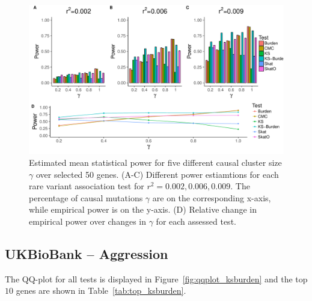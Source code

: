 \begin{figure}[ht!]
  \centering
  \includegraphics[width=0.8\linewidth]{ksburden/figures/combined_power_analysis.pdf}
  \caption{Estimated mean statistical power for five different causal cluster size $\gamma$ over selected 50 genes.
    (A-C) Different power estiamtions for each rare variant association test for $r^2=0.002, 0.006, 0.009$.
    The percentage of causal mutations $\gamma$ are on the corresponding x-axis, while empirical power is on the y-axis.
    (D) Relative change in empirical power over changes in $\gamma$ for each assessed test.\label{fig:simulatedGeneRealData}}
\end{figure}


\subsection{UKBioBank -- Aggression}
\label{sub:ukbiobank_aggression}

The QQ-plot for all tests is displayed in Figure~\ref{fig:qqplot_ksburden} and the top $10$ genes are shown in Table~\ref{tab:top_ksburden}.

